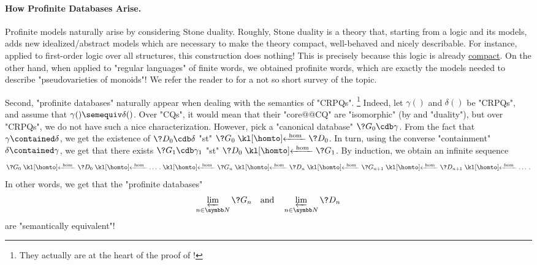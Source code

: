 \paragraph{How Profinite Databases Arise.}
Profinite models naturally arise
by considering Stone duality. Roughly, Stone duality is a theory that,
starting from a logic and its models, adds new idealized/abstract models which
are necessary to make the theory compact, well-behaved and nicely describable.
For instance, applied to first-order logic over all structures,
this construction does nothing! This is precisely because this logic is already
\href{https://en.wikipedia.org/wiki/Compactness\_theorem}{compact}.
On the other hand, when applied to "regular languages" of finite words,
we obtained profinite words, which are exactly the models needed to describe
"pseudovarieties of monoids"! We refer the reader to \cite{GehrkeGool2024Topological}
for a not so short survey of the topic.

Second, "profinite databases" naturally appear when dealing with the semantics
of "CRPQs".%
\footnote{They actually are at the heart of
the proof of !}
Indeed, let $\gamma()$ and $\delta()$ be "CRPQs",
and assume that $\gamma() \semequiv \delta()$. Over "CQs", it would mean that
their "core@@CQ" are "isomorphic" (by  and "duality"),
but over "CRPQs", we do not have such a nice characterization.
However, pick a "canonical database" $\?G_0 \cdb \gamma$. From the
fact that $\gamma \contained \delta$, we get the existence of $\?D_0 \cdb \delta$
"st" $\?G_0 \cohomto \?D_0$. In turn, using the converse "containment" $\delta \contained \gamma$,
we get that there exists $\?G_1 \cdb \gamma_1$ "st" $\?D_0 \cohomto \?G_1$. By induction,
we obtain an infinite sequence
\[
	\?G_0 \cohomto \?D_0 \cohomto \dotsc. \cohomto \?G_n \cohomto \?D_n \cohomto
	\?G_{n+1} \cohomto \?D_{n+1} \cohomto \dotsc.
\]
In other words, we get that the "profinite databases"
\[\varprojlim_{n\in\N} \?G_{n}
\quad\text{and}\quad
\varprojlim_{n\in\N} \?D_{n}\]
are "semantically equivalent"!

